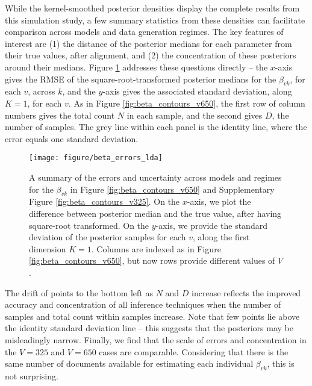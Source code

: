 \documentclass[oupdraft]{bio}
\begin{document}
While the kernel-smoothed posterior densities display the complete results from
this simulation study, a few summary statistics from these densities can
facilitate comparison across models and data generation regimes. The key
features of interest are (1) the distance of the posterior medians for each
parameter from their true values, after alignment, and (2) the concentration of
these posteriors around their medians. Figure \ref{fig:beta_errors_lda}
addresses these questions directly -- the $x$-axis gives the RMSE of the
square-root-transformed posterior medians for the $\beta_{vk}$, for each $v$,
across $k$, and the $y$-axis gives the associated standard deviation, along $K =
1$, for each $v$. As in Figure \ref{fig:beta_contours_v650}, the first row of
column numbers gives the total count $N$ in each sample, and the second gives
$D$, the number of samples. The grey line within each panel is the identity
line, where the error equals one standard deviation.

\begin{figure}
  \centering
  \texttt{[image: figure/beta\_errors\_lda]}
  \caption{A summary of the errors and uncertainty across models and regimes for
    the $\beta_{vk}$ in Figure \ref{fig:beta_contours_v650} and Supplementary
    Figure \ref{fig:beta_contours_v325}. On the $x$-axis, we plot the difference
    between posterior median and the true value, after having square-root
    transformed. On the $y$-axis, we provide the standard deviation of the
    posterior samples for each $v$, along the first dimension $K = 1$. Columns
    are indexed as in Figure \ref{fig:beta_contours_v650}, but now rows provide
    different values of $V$.
    \label{fig:beta_errors_lda} }
\end{figure}

The drift of points to the bottom left as $N$ and $D$ increase reflects the
improved accuracy and concentration of all inference techniques when the number
of samples and total count within samples increase. Note that few points lie
above the identity standard deviation line -- this suggests that the posteriors
may be misleadingly narrow. Finally, we find that the scale of errors and
concentration in the $V = 325$ and $V = 650$ cases are comparable. Considering
that there is the same number of documents available for estimating each
individual $\beta_{vk}$, this is not surprising.
\end{document}
